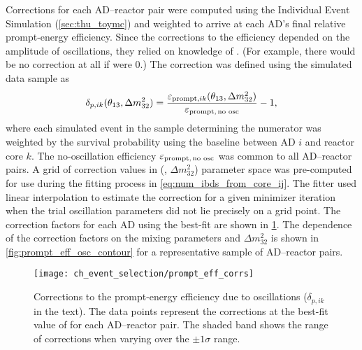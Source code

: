 Corrections for each AD--reactor pair were computed
using the Individual Event Simulation (\cref{sec:thu_toymc})
and weighted to arrive at each AD's final relative prompt-energy efficiency.
Since the corrections to the efficiency depended on
the amplitude of \nuebar{} oscillations, they relied on knowledge of \thetaot.
(For example, there would be no correction at all if \thetaot{} were $0$.)
The correction was defined using the simulated data sample as
\begin{equation}\label{eq:prompt_osc_correction}
    \delta_{p,ik}(\theta_{13}, \Delta m^2_{32}) =
    \frac{\varepsilon_{\text{prompt},ik}(\theta_{13}, \Delta m^2_{32})}{
        \varepsilon_{\text{prompt,\,no osc}}
    } - 1,
\end{equation}
where each simulated event in the sample determining the numerator
was weighted by the survival probability
using the baseline between AD $i$ and reactor core $k$.
The no-oscillation efficiency $\varepsilon_{\text{prompt,\,no osc}}$
was common to all AD--reactor pairs.
A grid of correction values in (\thetaot{}, $\Delta m^2_{32}$) parameter space
was pre-computed for use during the fitting process
in \cref{eq:num_ibds_from_core_ij}.
The fitter used linear interpolation to estimate the correction for
a given minimizer iteration when the trial oscillation parameters
did not lie precisely on a grid point.
The correction factors for each AD using the best-fit \thetaot{}
are shown in \cref{fig:prompt_eff_osc}.
The dependence of the correction factors
on the mixing parameters \thetaot{} and $\Delta m^2_{32}$
is shown in \cref{fig:prompt_eff_osc_contour}
for a representative sample of AD--reactor pairs.

\begin{figure}
    \centering
    \texttt{[image: ch\_event\_selection/prompt\_eff\_corrs]}
    \caption[Prompt efficiency corrections due to oscillation effects]{
        Corrections to the prompt-energy efficiency due to \nuebar{} oscillations
        ($\delta_{p,ik}$ in the text).
        The data points represent the corrections at the best-fit
        value of \thetaot{} for each AD--reactor pair.
        The shaded band shows the range of corrections when varying \thetaot{}
        over the $\pm1\sigma$ range.
    }
    \label{fig:prompt_eff_osc}
\end{figure}

